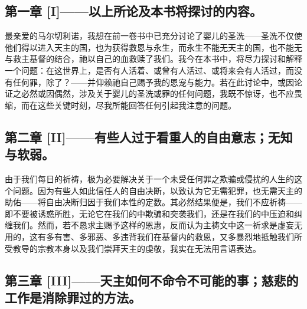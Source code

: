 
\subsection{第一章 [I]——以上所论及本书将探讨的内容。}

最亲爱的马尔切利诺，我想在前一卷书中已充分讨论了婴儿的圣洗——圣洗不仅使他们得以进入天主的国，也为获得救恩与永生，而永生不能无天主的国，也不能无与救主基督的结合，祂以自己的血救赎了我们。我今在本书中，将尽力探讨和解释一个问题：在这世界上，是否有人活着、或曾有人活过、或将来会有人活过，而没有任何罪，除了？——并仰赖祂自己赐予我的恩宠与能力。若在此讨论中，或因论证之必然或因偶然，涉及关于婴儿的圣洗或罪的任何问题，我既不惊讶，也不应畏缩，而在这些关键时刻，尽我所能回答任何引起我注意的问题。\par


\subsection{第二章 [II]——有些人过于看重人的自由意志；无知与软弱。}

由于我们每日的祈祷，极为必要解决关于一个未受任何罪之欺骗或侵扰的人生的这个问题。因为有些人如此信任人的自由决断，以致认为它无需犯罪，也无需天主的助佑——将自由决断归因于我们本性的定数。其必然结果便是，我们不应祈祷——即不要被诱惑所胜，无论它在我们的中欺骗和突袭我们，还是在我们的中压迫和纠缠我们。然而，若不恳求主赐予这样的恩惠，反而认为主祷文中这一祈求是虚妄无用的，这有多有害、多邪恶、多违背我们在基督内的救恩，又多暴烈地抵触我们所受教导的宗教本身以及我们崇拜天主的虔敬，我实在无法用言语表达。\par


\subsection{第三章 [III]——天主如何不命令不可能的事；慈悲的工作是消除罪过的方法。}

